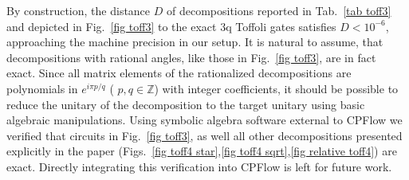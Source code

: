 \documentclass[twocolumn, amsfonts, amssymb, aps, nofootinbib]{revtex4-2}
\newcommand{\package}[1]{\textrm {#1 }}
\newcommand{\cpflow}{\package{CPFlow}}
\begin{document}
By construction, the distance $D$ of decompositions reported in Tab.~\ref{tab toff3} and depicted in Fig.~\ref{fig toff3} to the exact 3q Toffoli gates satisfies $D<10^{-6}$, approaching the machine precision in our setup. It is natural to assume, that decompositions with rational angles, like those in Fig.~\ref{fig toff3}, are in fact exact. Since all matrix elements of the rationalized decompositions are polynomials in $e^{i\pi p/q}$ ( $p,q\in\mathbb{Z}$) with integer coefficients, it should be possible to reduce the unitary of the decomposition to the target unitary using basic algebraic manipulations. Using symbolic algebra software external to \cpflow we verified that circuits in Fig.~\ref{fig toff3}, as well all other decompositions presented explicitly in the paper (Figs.~\ref{fig toff4 star},\ref{fig toff4 sqrt},\ref{fig relative toff4}) are exact. Directly integrating this verification into \cpflow is left for future work. 
\end{document}
